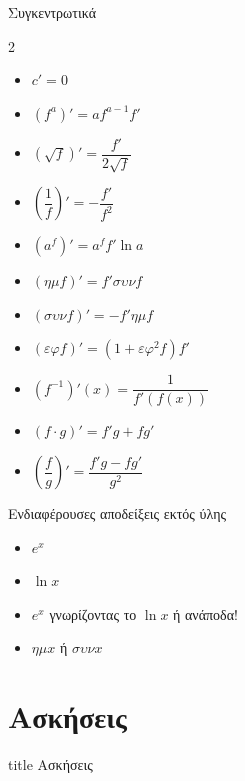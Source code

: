 \documentclass{presentation}
\begin{document}
\begin{frame}{Συγκεντρωτικά}
  \begin{small}
    \begin{multicols}{2}
      \begin{itemize}
        \item $c'=0$
        \item $(f^a)'=af^{a-1}f'$
        \item $\left(\sqrt{f}\right)'=\dfrac{f'}{2\sqrt{f}}$
        \item $\left( \dfrac{1}{f}\right)'=-\dfrac{f'}{f^2}$
        \item $(a^{f})'=a^{f}f'\ln a$
        \item $(ημf)'=f'συνf$
        \item $(συνf)'=-f'ημf$
        \item $(εφf)'=(1+εφ^2f)f'$
        \item $(f^{-1})'(x)=\dfrac{1}{f'(f(x))}$
        \item $(f\cdot g)'=f'g+fg'$
        \item $\left(\dfrac{f}{g}\right)'=\dfrac{f'g-fg'}{g^2}$
      \end{itemize}
    \end{multicols}
  \end{small}
\end{frame}

\begin{frame}{Ενδιαφέρουσες αποδείξεις εκτός ύλης}
  \label{Θεωρία}
  \begin{itemize}
    \item $e^x$ \hyperlink{Απόδειξη1}{}
    \item $\ln x$ \hyperlink{Απόδειξη2}{}
    \item $e^x$ γνωρίζοντας το $\ln x$ ή ανάποδα! \hyperlink{Απόδειξη3}{}
    \item $ημx$ ή $συνx$ \hyperlink{Απόδειξη4}{}
  \end{itemize}
\end{frame}


\section{Ασκήσεις}

\begin{frame}[noframenumbering]
  \vfill
  \centering
  \begin{beamercolorbox}[sep=8pt,center,shadow=true,rounded=true]{title}
    Ασκήσεις
  \end{beamercolorbox}
  \vfill
\end{frame}
\end{document}
